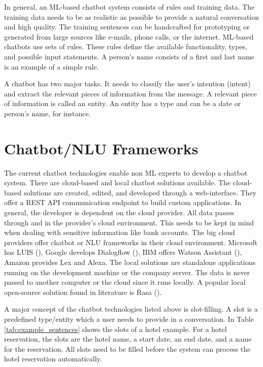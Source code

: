 In general, an ML-based chatbot system consists of rules and training data.
The training data needs to be as realistic as possible to provide a natural conversation and high quality.
The training sentences can be handcrafted for prototyping or generated from large sources like e-mails, phone calls, or the internet.
ML-based chatbots use sets of rules.
These rules define the available functionality, types, and possible input statements.
A person's name consists of a first and last name is an example of a simple rule.

A chatbot has two major tasks.
It needs to classify the user's intention (intent) and extract the relevant pieces of information from the message.
A relevant piece of information is called an entity.
An entity has a type and can be a date or person's name, for instance.

\section{Chatbot/NLU Frameworks}
The current chatbot technologies enable non ML experts to develop a chatbot system.
There are cloud-based and local chatbot solutions available.
The cloud-based solutions are created, edited, and developed through a web-interface. 
They offer a REST API communication endpoint to build custom applications.
In general, the developer is dependent on the cloud provider.
All data passes through and in the provider's cloud environment.
This needs to be kept in mind when dealing with sensitive information like bank accounts.
The big cloud providers offer chatbot or NLU frameworks in their cloud environment.
Microsoft has LUIS (\citet{luis2015williams, luisdocs}),
Google develops Dialogflow (\citet{dialogflow}),
IBM offers Watson Assistant (\citet{watsonassistant}),
Amazon provides Lex and Alexa.
The local solutions are standalone applications running on the development machine or the company server.
The data is never passed to another computer or the cloud since it runs locally.
A popular local open-source solution found in literature is Rasa (\citet{rasabocklisch2017,rasa}). 

A major concept of the chatbot technologies listed above is slot-filling.
A slot is a predefined type/entity which a user needs to provide in a conversation.
In Table \ref{tab:example_sentences} shows the slots of a hotel example.
For a hotel reservation, the slots are the hotel name, a start date, an end date, and a name for the reservation.
All slots need to be filled before the system can process the hotel reservation automatically.

